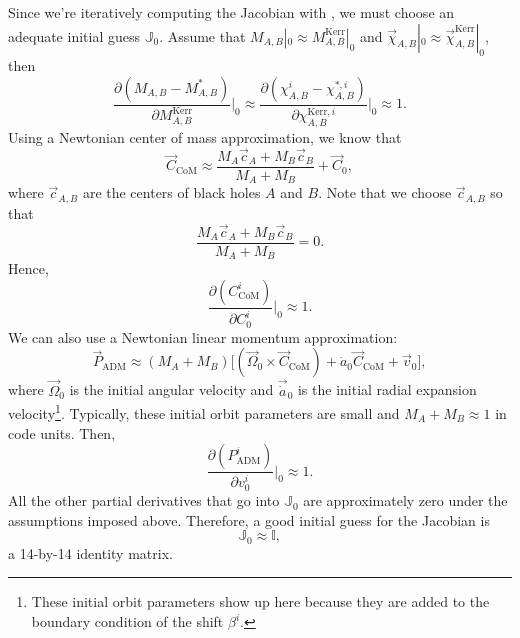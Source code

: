 \documentclass{../document}
\begin{document}
      Since we're iteratively computing the Jacobian with \eq{\eqref{eq:J-iteration}}, we must choose an adequate initial guess $\mathbb{J}_0$. Assume that $M_{A,B}|_0 \approx M^\text{Kerr}_{A,B}|_0$ and $\vec\chi_{A,B}|_0 \approx \vec\chi^\text{Kerr}_{A,B}|_0$, then
      \begin{equation}
        \frac{\partial (M_{A,B} - M^*_{A,B})}{\partial M^\text{Kerr}_{A,B}}\Bigg|_0
        \approx \frac{\partial (\chi^i_{A,B} - \chi^{*,i}_{A,B})}{\partial \chi^{\text{Kerr},i}_{A,B}}\Bigg|_0
        \approx 1.
      \end{equation}
      Using a Newtonian center of mass approximation, we know that
      \begin{equation}
        \vec C_\text{CoM} \approx \frac{M_A \vec c_A + M_B \vec c_B}{M_A + M_B} + \vec C_0,
      \end{equation}
      where $\vec c_{A,B}$ are the centers of black holes $A$ and $B$. Note that we choose $\vec c_{A,B}$ so that
      \begin{equation}
        \frac{M_A \vec c_A + M_B \vec c_B}{M_A + M_B} = 0.
      \end{equation}
      Hence,
      \begin{equation}
        \frac{\partial (C_\text{CoM}^i)}{\partial C_0^i}\Bigg|_0 \approx 1.
      \end{equation}
      We can also use a Newtonian linear momentum approximation:
      \begin{equation}
        \vec P_\text{ADM} \approx (M_A + M_B) \Big[ (\vec \Omega_0 \times \vec C_\text{CoM}) + \dot a_0 \vec C_\text{CoM} + \vec v_0 \Big],
      \end{equation}
      where $\vec \Omega_0$ is the initial angular velocity and $\vec \dot a_0$ is the initial radial expansion velocity\footnote{These initial orbit parameters show up here because they are added to the boundary condition of the shift $\beta^i$.}. Typically, these initial orbit parameters are small and $M_A + M_B \approx 1$ in code units. Then,
      \begin{equation}
        \frac{\partial (P_\text{ADM}^i)}{\partial v_0^i}\Bigg|_0 \approx 1.
      \end{equation}
      All the other partial derivatives that go into $\mathbb{J}_0$ are approximately zero under the assumptions imposed above. Therefore, a good initial guess for the Jacobian is
      \begin{equation}
        \mathbb{J}_0 \approx \mathbb{I},
      \end{equation}
      a 14-by-14 identity matrix.
    
\end{document}
